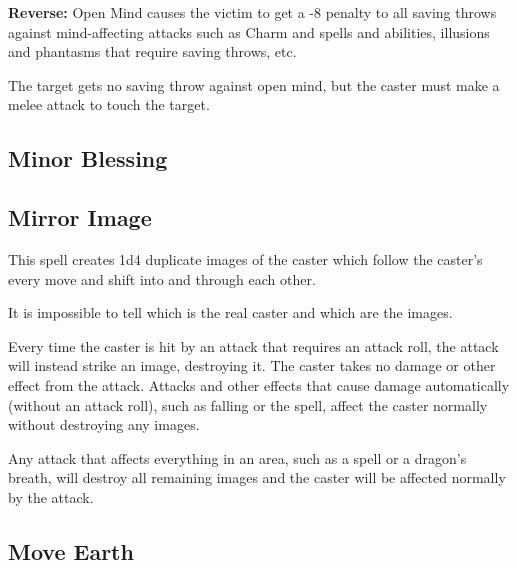\begin{multicols*}{2}
\textbf{Reverse:} \hypertarget{spell:Open Mind}{Open Mind} causes the victim to get a -8 penalty to all saving throws against mind-affecting attacks such as Charm and  spells and abilities, illusions and phantasms that require saving throws, etc.

The target gets no saving throw against open mind, but the caster must make a melee attack to touch the target.

\subsection{Minor Blessing}\label{spell:Minor Blessing}



\subsection{Mirror Image}\label{spell:Mirror Image}

This spell creates 1d4 duplicate images of the caster which follow the caster’s every move and shift into and through each other.

It is impossible to tell which is the real caster and which are the images.

Every time the caster is hit by an attack that requires an attack roll, the attack will instead strike an image, destroying it. The caster takes no damage or other effect from the attack. Attacks and other effects that cause damage automatically (without an attack roll), such as falling or the  spell, affect the caster normally without destroying any images.

Any attack that affects everything in an area, such as a  spell or a dragon’s breath, will destroy all remaining images and the caster will be affected normally by the attack.

\subsection{Move Earth}\label{spell:Move Earth}
\end{multicols*}
